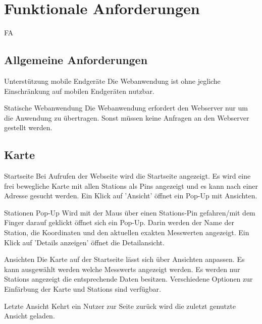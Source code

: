 \section{Funktionale Anforderungen}

\setcounter{counter}{10}
\begin{Kriterien}{FA}

\subsection{Allgemeine Anforderungen}

 \item[Unterstützung mobile Endgeräte]
   Die \gls{Webanwendung} ist ohne jegliche Einschränkung auf mobilen Endgeräten nutzbar.  

 \item[Statische Webanwendung]
   Die \gls{Webanwendung} erfordert den \gls{Webserver} nur um die Anwendung zu übertragen.
   Sonst müssen keine Anfragen an den \gls{Webserver} gestellt werden. 

\subsection{Karte}

 \item[Startseite]
   Bei Aufrufen der Webseite wird die Startseite angezeigt.
   Es wird eine frei bewegliche Karte mit allen \glspl{Station} als \glspl{Pin} angezeigt und es kann nach einer Adresse gesucht werden.
   Ein Klick auf 'Ansicht' öffnet ein \gls{Pop-Up} mit Ansichten.

 \item[Stationen Pop-Up]
  Wird mit der Maus über einen Stations-\gls{Pin} gefahren/mit dem Finger darauf geklickt öffnet sich ein \gls{Pop-Up}.
  Darin werden der Name der \gls{Station}, die Koordinaten und den aktuellen exakten Messwerten angezeigt.
  Ein Klick auf 'Details anzeigen' öffnet die Detailansicht.

 \item[Ansichten]
   Die Karte auf der Startseite lässt sich über Ansichten anpassen.
   Es kann ausgewählt werden welche \glspl{Messwert} angezeigt werden.
   Es werden nur \glspl{Station} angezeigt die entsprechende Daten besitzen.
   Verschiedene Optionen zur Einfärbung der Karte und \glspl{Station} sind verfügbar.

 \item[Letzte Ansicht]
  Kehrt ein Nutzer zur Seite zurück wird die zuletzt genutzte Ansicht geladen.


\end{Kriterien}
